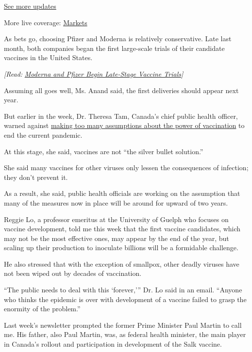 \href{https://www.nytimes3xbfgragh.onion/2020/08/21/world/covid-19-coronavirus.html?action=click\&pgtype=Article\&state=default\&region=MAIN_CONTENT_1\&context=storylines_live_updates}{See
more updates}

More live coverage:
\href{https://www.nytimes3xbfgragh.onion/live/2020/08/20/business/stock-market-today-coronavirus?action=click\&pgtype=Article\&state=default\&region=MAIN_CONTENT_1\&context=storylines_live_updates}{Markets}

As bets go, choosing Pfizer and Moderna is relatively conservative. Late
last month, both companies began the first large-scale trials of their
candidate vaccines in the United States.

\emph{{[}Read:}
\href{https://www.nytimes3xbfgragh.onion/2020/07/27/health/moderna-vaccine-covid.html}{\emph{Moderna
and Pfizer Begin Late-Stage Vaccine Trials}}\emph{{]}}

Assuming all goes well, Ms. Anand said, the first deliveries should
appear next year.

But earlier in the week, Dr. Theresa Tam, Canada's chief public health
officer, warned against
\href{https://www.cbc.ca/player/play/1772035651845}{making too many
assumptions about the power of vaccination} to end the current pandemic.

At this stage, she said, vaccines are not ``the silver bullet
solution.''

She said many vaccines for other viruses only lessen the consequences of
infection; they don't prevent it.

As a result, she said, public health officials are working on the
assumption that many of the measures now in place will be around for
upward of two years.

Reggie Lo, a professor emeritus at the University of Guelph who focuses
on vaccine development, told me this week that the first vaccine
candidates, which may not be the most effective ones, may appear by the
end of the year, but scaling up their production to inoculate billions
will be a formidable challenge.

He also stressed that with the exception of smallpox, other deadly
viruses have not been wiped out by decades of vaccination.

``The public needs to deal with this `forever,''' Dr. Lo said in an
email. ``Anyone who thinks the epidemic is over with development of a
vaccine failed to grasp the enormity of the problem.''

Last week's newsletter prompted the former Prime Minister Paul Martin to
call me. His father, also Paul Martin, was, as federal health minister,
the main player in Canada's rollout and participation in development of
the Salk vaccine.

